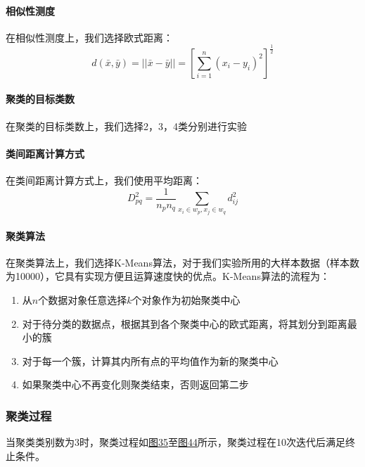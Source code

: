 \documentclass[UTF8]{ctexart}
\begin{document}
	\paragraph{相似性测度} 在相似性测度上，我们选择欧式距离：
	\begin{equation*}
	d(\bar{x}, \bar{y}) = ||\bar{x} -  \bar{y}|| = [\sum\limits_{i=1}^n (x_i - y_i)^2]^{
	\frac{1}{2}}
	\end{equation*}
	
	\paragraph{聚类的目标类数} 在聚类的目标类数上，我们选择2，3，4类分别进行实验
	
	\paragraph{类间距离计算方式} 在类间距离计算方式上，我们使用平均距离：
	\begin{equation*}
	D_{pq}^2 = \frac{1}{n_pn_q} \sum_{x_i \in w_p, x_j \in w_q} d_{ij}^2
	\end{equation*}
	
	\paragraph{聚类算法} 在聚类算法上，我们选择K-Means算法，对于我们实验所用的大样本数据（样本数为10000），它具有实现方便且运算速度快的优点。K-Means算法的流程为：
	\begin{enumerate}
		\item 从$n$个数据对象任意选择$k$个对象作为初始聚类中心
		\item 对于待分类的数据点，根据其到各个聚类中心的欧式距离，将其划分到距离最小的簇
		\item 对于每一个簇，计算其内所有点的平均值作为新的聚类中心
		\item 如果聚类中心不再变化则聚类结束，否则返回第二步
	\end{enumerate}

	\subsubsection{聚类过程} 当聚类类别数为3时，聚类过程如\hyperref[Fig.35]{图35}至\hyperref[Fig.44]{图44}所示，聚类过程在10次迭代后满足终止条件。	
	
\end{document}
